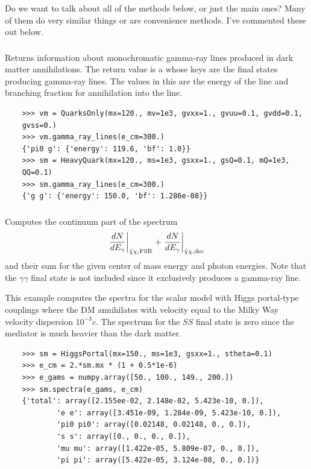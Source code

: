 {\color{red} Do we want to talk about all of the methods below, or just the main ones? Many of them do very similar things or are convenience methods. I've commented these out below.}

\subsubsection{}

Returns information about monochromatic gamma-ray lines produced in dark matter annihilations. The return value is a  whose keys are the final states producing gamma-ray lines. The values in this  are the energy of the line and branching fraction for annihilation into the line.

\begin{verbatim}
    >>> vm = QuarksOnly(mx=120., mv=1e3, gvxx=1., gvuu=0.1, gvdd=0.1,
    gvss=0.)
    >>> vm.gamma_ray_lines(e_cm=300.)
    {'pi0 g': {'energy': 119.6, 'bf': 1.0}}
    >>> sm = HeavyQuark(mx=120., ms=1e3, gsxx=1., gsQ=0.1, mQ=1e3,
    QQ=0.1)
    >>> sm.gamma_ray_lines(e_cm=300.)
    {'g g': {'energy': 150.0, 'bf': 1.286e-08}}
\end{verbatim}

\subsubsection{}

Computes the continuum part of the spectrum
\begin{align}
    \left. \frac{dN}{dE_\gamma} \right|_{\bar{\chi}\chi,{\mathrm{FSR}}} + \left. \frac{dN}{dE_\gamma} \right|_{\bar{\chi}\chi,{\mathrm{dec}}}
\end{align}
and their sum for the given center of mass energy and photon energies. Note that the $\gamma\gamma$ final state is not included since it exclusively produces a gamma-ray line.

This example computes the spectra for the scalar model with Higgs portal-type couplings where the DM annihilates with velocity equal to the Milky Way velocity dispersion $10^{-3} c$. The spectrum for the $S S$ final state is zero since the mediator is much heavier than the dark matter.

\begin{verbatim}
    >>> sm = HiggsPortal(mx=150., ms=1e3, gsxx=1., stheta=0.1)
    >>> e_cm = 2.*sm.mx * (1 + 0.5*1e-6)
    >>> e_gams = numpy.array([50., 100., 149., 200.])
    >>> sm.spectra(e_gams, e_cm)
    {'total': array([2.155ee-02, 2.148e-02, 5.423e-10, 0.]),
            'e e': array([3.451e-09, 1.284e-09, 5.423e-10, 0.]),
            'pi0 pi0': array([0.02148, 0.02148, 0., 0.]),
            's s': array([0., 0., 0., 0.]),
            'mu mu': array([1.422e-05, 5.809e-07, 0., 0.]),
            'pi pi': array([5.422e-05, 3.124e-08, 0., 0.])}
\end{verbatim}


